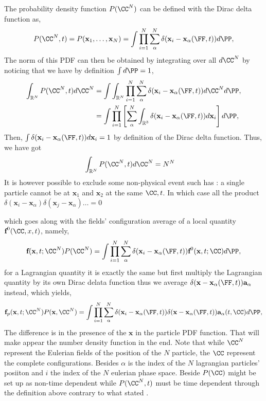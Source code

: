 The probability density function $P(\CC^N)$ can be defined with the Dirac delta function as, 
\begin{equation*}
    P(\CC^N,t)
    =
    P(\textbf{x}_1,\ldots,\textbf{x}_N)
    = \int 
    \prod_{i=1}^{N}\sum_{\alpha}^{N}\delta(\textbf{x}_i - \textbf{x}_\alpha(\FF,t))
    d\PP,
\end{equation*}
The norm of this PDF can then be obtained by integrating over all $d\CC^N$ by noticing that we have by definition $\int d\PP = 1$, 
\begin{align*}
    \int_{\mathbb{R}^N} P(\CC^N,t) d\CC^N
    &= 
    \int 
    \int_{\mathbb{R}^N}
    \prod_{i=1}^{N}
    \sum_{\alpha}^{N}
    \delta(\textbf{x}_i - \textbf{x}_\alpha(\FF,t))
    d\CC^N
    d\PP,\\
    &= 
    \int 
    \prod_{i=1}^{N}\left[
    \sum_{\alpha}^{N}
    \int_{\mathbb{R}^3}
    \delta(\textbf{x}_i - \textbf{x}_\alpha(\FF,t))
    d\textbf{x}_i\right]
    d\PP,
\end{align*}
Then, $\int \delta(\textbf{x}_i - \textbf{x}_\alpha(\FF,t)) d\textbf{x}_i= 1$ by definition of the Dirac delta function. 
Thus, we have got 
\begin{align*}
    \int_{\mathbb{R}^N} P(\CC^N,t) d\CC^N
    &= 
    N^N
\end{align*}
It is however possible to exclude some non-physical event such has : a single particle cannot be at $\textbf{x}_1$ and $\textbf{x}_2$ at the same $\CC,t$. 
In which case all the product $\delta(\textbf{x}_i - \textbf{x}_\alpha)\delta(\textbf{x}_j - \textbf{x}_\alpha)\ldots  = 0$

which goes along with the fields' configuration average of a local quantity $\textbf{f}^0(\CC,x,t)$, namely, 
\begin{equation*}
    \textbf{f}(\textbf{x},t;\CC^N) P(\CC^N)
    = \int 
    \prod_{i=1}^{N}\sum_{\alpha}^{N}\delta(\textbf{x}_i - \textbf{x}_\alpha(\FF,t)) \textbf{f}^0(\textbf{x},t;\CC)
    d\PP,
\end{equation*}
for a Lagrangian quantity it is exactly the same but first multiply the Lagrangian quantity by its own Dirac delata function thus we average $\delta(\textbf{x}-\textbf{x}_\alpha(\FF,t)) \textbf{a}_\alpha$ instead, which yields, 
\begin{equation*}
    \textbf{f}_p(\textbf{x},t;\CC^N) P(\textbf{x},\CC^N)
    = \int 
    \prod_{i=1}^{N}\sum_{\alpha}^{N}\delta(\textbf{x}_i - \textbf{x}_\alpha(\FF,t)) 
    \delta(\textbf{x} - \textbf{x}_\alpha(\FF,t)) 
    \textbf{a}_\alpha(t,\CC)
    d\PP,
\end{equation*}
The difference is in the presence of the $\textbf{x}$ in the particle PDF function. 
That will make appear the number density function in the end. 
Note that while $\CC^N$ represent the Eulerian fields of the position of the $N$ particle, the $\CC$ represent the complete configurations.
Besides $\alpha$ is the index of the $N$ lagrangian particles' posiiton and $i$ the index of the $N$ eulerian phase space.
Beside $P(\CC)$  might be set up as non-time dependent while $P(\CC^N,t)$ must be time dependent through the definition above contrary to what stated \citet{zhang1994ensemble}. 

